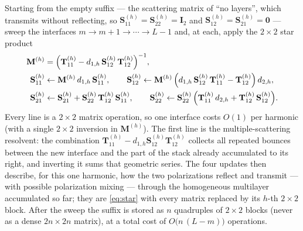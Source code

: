 \documentclass[11pt]{article}
\theoremstyle{remark}
\newcommand{\Id}{\mathbf{I}}
\begin{document}
\begin{enumerate}
  Starting from the empty suffix --- the scattering matrix of ``no layers'',
  which transmits without reflecting, so $\mathbf{S}^{(h)}_{11}=
  \mathbf{S}^{(h)}_{22}=\Id_2$ and $\mathbf{S}^{(h)}_{12}=\mathbf{S}^{(h)}_{21}
  =\mathbf{0}$ --- sweep the interfaces $m\to m+1\to\cdots\to L-1$ and, at
  each, apply the $2\times2$ star product
  \begin{equation}
  \begin{aligned}
  \mathbf{M}^{(h)}&=\Bigl(\mathbf{T}^{(h)}_{11}
  -d_{1,h}\,\mathbf{S}^{(h)}_{12}\,\mathbf{T}^{(h)}_{12}\Bigr)^{-1},\\
  \mathbf{S}^{(h)}_{11}&\leftarrow\mathbf{M}^{(h)}\,d_{1,h}\,
  \mathbf{S}^{(h)}_{11},\qquad
  \mathbf{S}^{(h)}_{12}\leftarrow\mathbf{M}^{(h)}\,
  \Bigl(d_{1,h}\,\mathbf{S}^{(h)}_{12}\,\mathbf{T}^{(h)}_{11}
  -\mathbf{T}^{(h)}_{12}\Bigr)\,d_{2,h},\\
  \mathbf{S}^{(h)}_{21}&\leftarrow\mathbf{S}^{(h)}_{21}
  +\mathbf{S}^{(h)}_{22}\,\mathbf{T}^{(h)}_{12}\,\mathbf{S}^{(h)}_{11},\qquad
  \mathbf{S}^{(h)}_{22}\leftarrow\mathbf{S}^{(h)}_{22}\,
  \Bigl(\mathbf{T}^{(h)}_{11}\,d_{2,h}
  +\mathbf{T}^{(h)}_{12}\,\mathbf{S}^{(h)}_{12}\Bigr).
  \end{aligned}
  \label{eq:perharmonic}
  \end{equation}
  Every line is a $2\times2$ matrix operation, so one interface costs $O(1)$
  per harmonic (with a single $2\times2$ inversion in $\mathbf{M}^{(h)}$).
  The first line is the multiple-scattering resolvent: the combination
  $\mathbf{T}^{(h)}_{11}-d_{1,h}\mathbf{S}^{(h)}_{12}\mathbf{T}^{(h)}_{12}$
  collects all repeated bounces between the new interface and the part of the
  stack already accumulated to its right, and inverting it sums that geometric
  series.  The four updates then describe, for this one harmonic, how the two
  polarizations reflect and transmit --- with possible polarization mixing ---
  through the homogeneous multilayer accumulated so far; they are
  \eqref{eq:star} with every matrix replaced by its $h$-th $2\times2$ block.
  After the sweep the suffix is stored as $n$ quadruples of $2\times2$ blocks
  (never as a dense $2n\times2n$ matrix), at a total cost of
  $O\bigl(n\,(L-m)\bigr)$ operations.


\end{enumerate}
\end{document}
